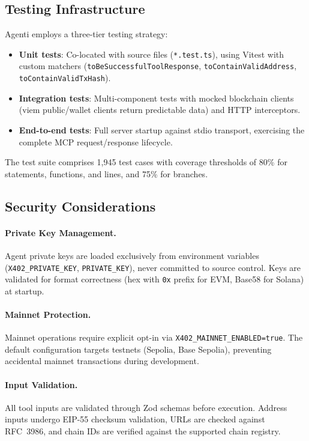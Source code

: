 \documentclass[11pt]{article}
\begin{document}
\subsection{Testing Infrastructure}

Agenti employs a three-tier testing strategy:

\begin{itemize}[leftmargin=*]
  \item \textbf{Unit tests}: Co-located with source files (\texttt{*.test.ts}), using Vitest with custom matchers (\texttt{toBeSuccessfulToolResponse}, \texttt{toContainValidAddress}, \texttt{toContainValidTxHash}).
  \item \textbf{Integration tests}: Multi-component tests with mocked blockchain clients (viem public/wallet clients return predictable data) and HTTP interceptors.
  \item \textbf{End-to-end tests}: Full server startup against stdio transport, exercising the complete MCP request/response lifecycle.
\end{itemize}

The test suite comprises 1,945 test cases with coverage thresholds of 80\% for statements, functions, and lines, and 75\% for branches.

\subsection{Security Considerations}

\paragraph{Private Key Management.} Agent private keys are loaded exclusively from environment variables (\texttt{X402\_PRIVATE\_KEY}, \texttt{PRIVATE\_KEY}), never committed to source control. Keys are validated for format correctness (hex with \texttt{0x} prefix for EVM, Base58 for Solana) at startup.

\paragraph{Mainnet Protection.} Mainnet operations require explicit opt-in via \texttt{X402\_MAINNET\_ENABLED=true}. The default configuration targets testnets (Sepolia, Base Sepolia), preventing accidental mainnet transactions during development.

\paragraph{Input Validation.} All tool inputs are validated through Zod schemas before execution. Address inputs undergo EIP-55 checksum validation, URLs are checked against RFC~3986, and chain IDs are verified against the supported chain registry.
\end{document}
